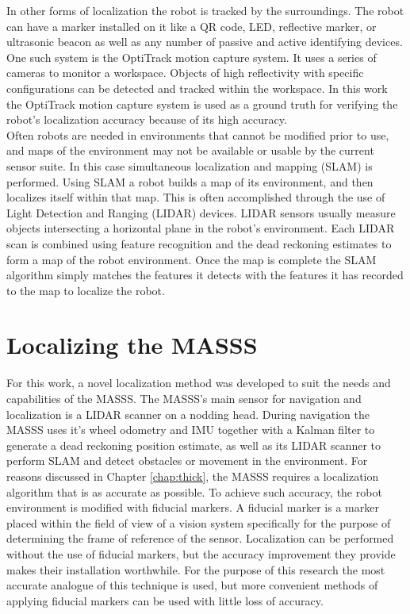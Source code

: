 In other forms of localization the robot is tracked by the surroundings. The robot can have a marker installed on it like a QR code, LED, reflective marker, or ultrasonic beacon as well as any number of passive and active identifying devices. One such system is the OptiTrack motion capture system. It uses a series of cameras to monitor a workspace. Objects of high reflectivity with specific configurations can be detected and tracked within the workspace. In this work the OptiTrack motion capture system is used as a ground truth for verifying the robot's localization accuracy because of its high accuracy.\\

Often robots are needed in environments that cannot be modified prior to use, and maps of the environment may not be available or usable by the current sensor suite. In this case simultaneous localization and mapping (SLAM) is performed. Using SLAM a robot builds a map of its environment, and then localizes itself within that map. This is often accomplished through the use of Light Detection and Ranging (LIDAR) devices. LIDAR sensors usually measure objects intersecting a horizontal plane in the robot's environment. Each LIDAR scan is combined using feature recognition and the dead reckoning estimates to form a map of the robot environment. Once the map is complete the SLAM algorithm simply matches the features it detects with the features it has recorded to the map to localize the robot.\\

\section{Localizing the MASSS}

For this work, a novel localization method was developed to suit the needs and capabilities of the MASSS. The MASSS's main sensor for navigation and localization is a LIDAR scanner on a nodding head. During navigation the MASSS uses it's wheel odometry and IMU together with a Kalman filter to generate a dead reckoning position estimate, as well as its LIDAR scanner to perform SLAM and detect obstacles or movement in the environment. For reasons discussed in Chapter \ref{chap:thick}, the MASSS requires a localization algorithm that is as accurate as possible. To achieve such accuracy, the robot environment is modified with fiducial markers. A fiducial marker is a marker placed within the field of view of a vision system specifically for the purpose of determining the frame of reference of the sensor. Localization can be performed without the use of fiducial markers, but the accuracy improvement they provide makes their installation worthwhile. For the purpose of this research the most accurate analogue of this technique is used, but more convenient methods of applying fiducial markers can be used with little loss of accuracy.\\

